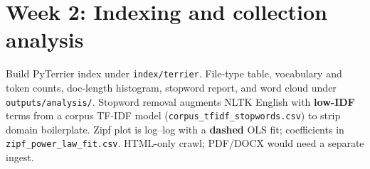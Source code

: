 \section{Week 2: Indexing and collection analysis}
Build PyTerrier index under \texttt{index/terrier}. File-type table, vocabulary and token counts, doc-length histogram, stopword report, and word cloud under \texttt{outputs/analysis/}. Stopword removal augments NLTK English with \textbf{low-IDF} terms from a corpus TF-IDF model (\texttt{corpus\_tfidf\_stopwords.csv}) to strip domain boilerplate. Zipf plot is log--log with a \textbf{dashed} OLS fit; coefficients in \texttt{zipf\_power\_law\_fit.csv}. HTML-only crawl; PDF/DOCX would need a separate ingest.
